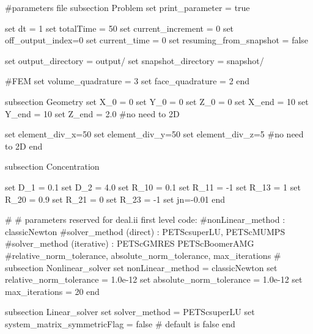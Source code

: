 \begin{DoxyCode}
\textcolor{preprocessor}{#parameters file}
\textcolor{preprocessor}{}
subsection Problem
set print\_parameter = \textcolor{keyword}{true}

set dt = 1
set totalTime = 50
set current\_increment = 0
set off\_output\_index=0
set current\_time = 0
set resuming\_from\_snapshot = \textcolor{keyword}{false}

set output\_directory = output/
set snapshot\_directory = snapshot/

\textcolor{preprocessor}{#FEM}
\textcolor{preprocessor}{}set volume\_quadrature = 3 
set face\_quadrature = 2 
end

subsection Geometry
set X\_0 = 0
set Y\_0 = 0
set Z\_0 = 0
set X\_end = 10
set Y\_end = 10
set Z\_end = 2.0 #no need to 2D

set element\_div\_x=50
set element\_div\_y=50
set element\_div\_z=5 #no need to 2D
end

subsection Concentration

set D\_1 = 0.1
set D\_2 = 4.0
set R\_10 = 0.1
set R\_11 = -1
set R\_13 = 1
set R\_20 = 0.9
set R\_21 = 0
set R\_23 = -1
set jn=-0.01
end
                        
\textcolor{preprocessor}{#}
\textcolor{preprocessor}{}\textcolor{preprocessor}{# parameters reserved for deal.ii first level code:}
\textcolor{preprocessor}{}\textcolor{preprocessor}{#nonLinear\_method : classicNewton}
\textcolor{preprocessor}{}\textcolor{preprocessor}{#solver\_method (direct) : PETScsuperLU, PETScMUMPS}
\textcolor{preprocessor}{}\textcolor{preprocessor}{#solver\_method (iterative) : PETScGMRES PETScBoomerAMG}
\textcolor{preprocessor}{}\textcolor{preprocessor}{#relative\_norm\_tolerance, absolute\_norm\_tolerance, max\_iterations}
\textcolor{preprocessor}{}\textcolor{preprocessor}{#}
\textcolor{preprocessor}{}subsection Nonlinear\_solver
        set nonLinear\_method = classicNewton
        set relative\_norm\_tolerance = 1.0e-12
        set absolute\_norm\_tolerance = 1.0e-12
        set max\_iterations = 20
end
                        
subsection Linear\_solver
        set solver\_method = PETScsuperLU
        set system\_matrix\_symmetricFlag = \textcolor{keyword}{false} # \textcolor{keywordflow}{default} is \textcolor{keyword}{false}
end
\end{DoxyCode}
 